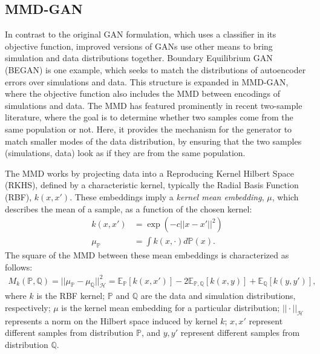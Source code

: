 \documentclass{article} %
\begin{document}
\subsection{MMD-GAN}
In contrast to the original GAN formulation, which uses a classifier in its objective function, improved versions of GANs use other means to bring simulation and data distributions together. Boundary Equilibrium GAN (BEGAN) is one example, which seeks to match the distributions of autoencoder errors over simulations and data. This structure is expanded in MMD-GAN, where the objective function also includes the MMD between encodings of simulations and data. The MMD has featured prominently in recent two-sample literature, where the goal is to determine whether two samples come from the same population or not. Here, it provides the mechanism for the generator to match smaller modes of the data distribution, by ensuring that the two samples (simulations, data) look as if they are from the same population.

The MMD works by projecting data into a Reproducing Kernel Hilbert Space (RKHS), defined by a characteristic kernel, typically the Radial Basis Function (RBF), $k(x, x')$. These embeddings imply a \textit{kernel mean embedding}, $\mu$, which describes the mean of a sample, as a function of the chosen kernel:
\begin{align}
k(x, x') &= \exp (-c||x - x'||^2) \label{rbf}\\
\mu_\mathbb{P} &= \int k(x,\cdot) d\mathbb{P}(x).
\end{align} 
The square of the MMD between these mean embeddings is characterized as follows:
\begin{align}
M_k(\mathbb{P}, \mathbb{Q}) = ||\mu_{\mathbb{P}} - \mu_{\mathbb{Q}}||^2_\mathcal{H} = \mathbb{E}_\mathbb{P}[k(x,x')] - 2 \mathbb{E}_{\mathbb{P}, \mathbb{Q}}[k(x,y)] + \mathbb{E}_{\mathbb{Q}}[k(y,y')],
\end{align}
where $k$ is the RBF kernel; $\mathbb{P}$ and $\mathbb{Q}$ are the data and simulation distributions, respectively; $\mu$ is the kernel mean embedding for a particular distribution; $||\cdot||_{\mathcal{H}}$ represents a norm on the Hilbert space induced by kernel $k$; $x, x'$ represent different samples from distribution $\mathbb{P}$, and $y, y'$ represent different samples from distribution $\mathbb{Q}$.
\end{document}

